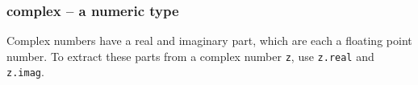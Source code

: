 \subsubsection{complex -- a numeric type}
Complex numbers have a real and imaginary part, which are each a floating point number.
To extract these parts from a complex number \texttt{z}, use \texttt{z.real} and \texttt{z.imag}.

